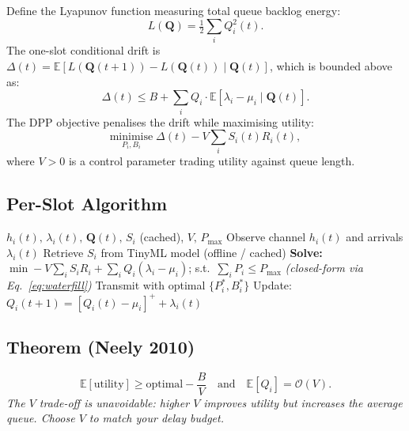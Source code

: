 \documentclass[conference]{IEEEtran}
\begin{document}
Define the Lyapunov function measuring total queue backlog energy:
\begin{equation}
L(\mathbf{Q}) = \tfrac{1}{2}\sum_i Q_i^2(t).
\label{eq:lyapunov}
\end{equation}
The one-slot conditional drift is $\Delta(t) = \mathbb{E}[L(\mathbf{Q}(t{+}1)) - L(\mathbf{Q}(t))\mid\mathbf{Q}(t)]$, which is bounded above as:
\begin{equation}
\Delta(t) \le B + \sum_i Q_i \cdot \mathbb{E}[\lambda_i - \mu_i \mid \mathbf{Q}(t)].
\label{eq:drift_bound}
\end{equation}
The DPP objective penalises the drift while maximising utility:
\begin{equation}
\underset{P_i,B_i}{\text{minimise}}\; \Delta(t) - V\sum_i S_i(t)R_i(t),
\end{equation}
where $V>0$ is a control parameter trading utility against queue length.

\subsection{Per-Slot Algorithm}

\begin{algorithm}[!t]
\caption{Lyapunov DPP Resource Allocation (Per Slot)}
\label{alg:dpp}
\begin{algorithmic}[1]
\Require $h_i(t),\,\lambda_i(t),\,\mathbf{Q}(t),\,S_i$ (cached), $V,\,P_{\max}$
\State Observe channel $h_i(t)$ and arrivals $\lambda_i(t)$
\State Retrieve $S_i$ from TinyML model (offline / cached)
\State \textbf{Solve:} $\min -V\!\sum_i S_i R_i + \sum_i Q_i(\lambda_i{-}\mu_i)$; s.t.\ $\sum_i P_i \le P_{\max}$ \hfill \textit{(closed-form via Eq.~\eqref{eq:waterfill})}
\State Transmit with optimal $\{P_i^*,B_i^*\}$
\State Update: $Q_i(t{+}1) = [Q_i(t) - \mu_i]^+ + \lambda_i(t)$
\end{algorithmic}
\end{algorithm}

\subsection{Theorem (Neely 2010)}
\begin{equation}
\mathbb{E}[\text{utility}] \ge \text{optimal} - \frac{B}{V}
\quad\text{and}\quad
\mathbb{E}[Q_i] = \mathcal{O}(V).
\end{equation}
\textit{The $V$ trade-off is unavoidable: higher $V$ improves utility but increases the average queue. Choose $V$ to match your delay budget.}
\end{document}
